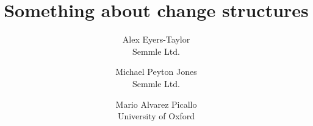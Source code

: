 \documentclass[english]{article}
\begin{document}
\title{Something about change structures}

\author{
  Alex Eyers-Taylor\\
  Semmle Ltd.
  \and
  Michael Peyton Jones\\
  Semmle Ltd.
  \and
  Mario Alvarez Picallo\\
  University of Oxford
}

\maketitle

\nocite{*}


\end{document}

